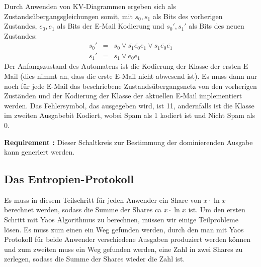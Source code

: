 \documentclass{article}
\newcounter{requirementscount}{}
\newcommand{\requirement}[1] {
        \addtocounter{requirementscount}{1}
        {\bf Requirement \therequirementscount:} #1\\
    }
\begin{document}
Durch Anwenden von KV-Diagrammen ergeben sich als Zustands\"ubergangsgleichungen
somit, mit \(s_0, s_1\) als Bits des vorherigen Zustandes, \(e_0, e_1\) als Bits
der E-Mail Kodierung und \(s_0', s_1'\) als Bits des neuen Zustandes:
\begin{align*}
s_0' &=& s_0 \vee \overline{s_1} \overline{e_0} e_1
           \vee s_1 \overline{e_0} \overline{e_1}\\
s_1' &=& s_1 \vee \overline{e_0} e_1
\end{align*}
Der Anfangszustand des Automatens ist die Kodierung der Klasse der ersten
E-Mail (dies nimmt an, dass die erste E-Mail nicht abwesend ist).
Es muss dann nur noch f\"ur jede E-Mail das beschriebene Zustands\"ubergangsnetz
von den vorherigen Zust\"anden und der Kodierung der Klasse der aktuellen
E-Mail implementiert werden. Das Fehlersymbol, das ausgegeben wird, ist 11,
andernfalls ist die Klasse im zweiten Ausgabebit Kodiert, wobei Spam als 1 
kodiert ist und Nicht Spam als 0.\\
\requirement{Dieser Schaltkreis zur Bestimmung der dominierenden Ausgabe kann
generiert werden.}

\subsection{Das Entropien-Protokoll}
Es muss in diesem Teilschritt f\"ur jeden Anwender ein Share von
 \(x\cdot \ln x\) berechnet werden, sodass die Summe der Shares
 ca \(x \cdot \ln x\) ist.
Um den ersten Schritt mit Yaos Algorithmus zu berechnen, m\"ussen
wir einige Teilprobleme l\"osen. Es muss zum einen ein Weg gefunden
werden, durch den man mit Yaos Protokoll f\"ur beide Anwender
verschiedene Ausgaben produziert werden k\"onnen und zum zweiten muss
ein Weg gefunden werden, eine Zahl in zwei Shares zu zerlegen, sodass die
Summe der Shares wieder die Zahl ist.
\end{document}
